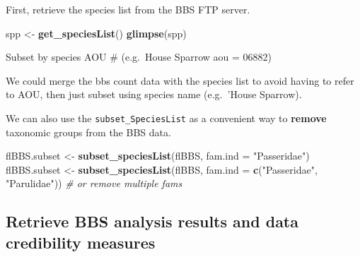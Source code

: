 \documentclass[12pt,twoside,openany]{reedthesis}
\newenvironment{Shaded}{\begin{snugshade}}{\end{snugshade}}
\newcommand{\CommentTok}[1]{\textcolor[rgb]{0.56,0.35,0.01}{\textit{#1}}}
\newcommand{\DataTypeTok}[1]{\textcolor[rgb]{0.13,0.29,0.53}{#1}}
\newcommand{\DecValTok}[1]{\textcolor[rgb]{0.00,0.00,0.81}{#1}}
\newcommand{\KeywordTok}[1]{\textcolor[rgb]{0.13,0.29,0.53}{\textbf{#1}}}
\newcommand{\NormalTok}[1]{#1}
\newcommand{\OperatorTok}[1]{\textcolor[rgb]{0.81,0.36,0.00}{\textbf{#1}}}
\newcommand{\StringTok}[1]{\textcolor[rgb]{0.31,0.60,0.02}{#1}}
\begin{document}
First, retrieve the species list from the BBS FTP server.
\begin{Shaded}
\begin{Highlighting}[]
\NormalTok{spp <-}\StringTok{ }\KeywordTok{get_speciesList}\NormalTok{()}
\KeywordTok{glimpse}\NormalTok{(spp)}
\end{Highlighting}
\end{Shaded}
Subset by species AOU \# (e.g.~House Sparrow aou = 06882)
\begin{Shaded}
\end{Shaded}
We could merge the bbs count data with the species list to avoid having to refer to AOU, then just subset using species name (e.g.~'House Sparrow).
\begin{Shaded}
\end{Shaded}
We can also use the \texttt{subset\_SpeciesList} as a convenient way to \textbf{remove} taxonomic groups from the BBS data.
\begin{Shaded}
\begin{Highlighting}[]
\NormalTok{flBBS.subset <-}\StringTok{ }\KeywordTok{subset_speciesList}\NormalTok{(flBBS, }\DataTypeTok{fam.ind =} \StringTok{"Passeridae"}\NormalTok{)}
\NormalTok{flBBS.subset <-}\StringTok{ }\KeywordTok{subset_speciesList}\NormalTok{(flBBS, }\DataTypeTok{fam.ind =} \KeywordTok{c}\NormalTok{(}\StringTok{"Passeridae"}\NormalTok{, }\StringTok{"Parulidae"}\NormalTok{)) }\CommentTok{# or remove multiple fams}
\end{Highlighting}
\end{Shaded}
\hypertarget{retrieve-bbs-analysis-results-and-data-credibility-measures}{%
\subsection{Retrieve BBS analysis results and data credibility measures}\label{retrieve-bbs-analysis-results-and-data-credibility-measures}}
\end{document}

